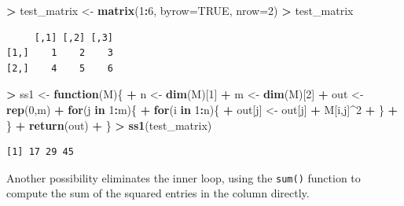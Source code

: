 \documentclass[]{krantz}
\makeatletter
\newenvironment{Shaded}{\begin{snugshade}}{\end{snugshade}}
\newcommand{\KeywordTok}[1]{\textcolor[rgb]{0.27,0.27,0.27}{\textbf{#1}}}
\newcommand{\DataTypeTok}[1]{\textcolor[rgb]{0.27,0.27,0.27}{#1}}
\newcommand{\DecValTok}[1]{\textcolor[rgb]{0.06,0.06,0.06}{#1}}
\newcommand{\StringTok}[1]{\textcolor[rgb]{0.5,0.5,0.5}{#1}}
\newcommand{\OtherTok}[1]{\textcolor[rgb]{0.37,0.37,0.37}{#1}}
\newcommand{\ControlFlowTok}[1]{\textcolor[rgb]{0.27,0.27,0.27}{\textbf{#1}}}
\newcommand{\OperatorTok}[1]{\textcolor[rgb]{0.43,0.43,0.43}{\textbf{#1}}}
\newcommand{\NormalTok}[1]{#1}
\newenvironment{kframe}{%
\medskip{}
\setlength{\fboxsep}{.8em}
 \def\at@end@of@kframe{}%
 \ifinner\ifhmode%
  \def\at@end@of@kframe{\end{minipage}}%
  \begin{minipage}{\columnwidth}%
 \fi\fi%
 \def\FrameCommand##1{\hskip\@totalleftmargin \hskip-\fboxsep
 \colorbox{shadecolor}{##1}\hskip-\fboxsep
     \hskip-\linewidth \hskip-\@totalleftmargin \hskip\columnwidth}%
 \MakeFramed {\advance\hsize-\width
   \@totalleftmargin\z@ \linewidth\hsize
   \@setminipage}}%
 {\par\unskip\endMakeFramed%
 \at@end@of@kframe}
\renewenvironment{Shaded}{\begin{kframe}}{\end{kframe}}
\makeatother
\begin{document}
\begin{Shaded}
\begin{Highlighting}[]
\OperatorTok{>}\StringTok{ }\NormalTok{test_matrix <-}\StringTok{ }\KeywordTok{matrix}\NormalTok{(}\DecValTok{1}\OperatorTok{:}\DecValTok{6}\NormalTok{, }\DataTypeTok{byrow=}\OtherTok{TRUE}\NormalTok{, }\DataTypeTok{nrow=}\DecValTok{2}\NormalTok{)}
\OperatorTok{>}\StringTok{ }\NormalTok{test_matrix}
\end{Highlighting}
\end{Shaded}

\begin{verbatim}
     [,1] [,2] [,3]
[1,]    1    2    3
[2,]    4    5    6
\end{verbatim}

\begin{Shaded}
\begin{Highlighting}[]
\OperatorTok{>}\StringTok{ }\NormalTok{ss1 <-}\StringTok{ }\ControlFlowTok{function}\NormalTok{(M)\{}
\OperatorTok{+}\StringTok{     }\NormalTok{n <-}\StringTok{ }\KeywordTok{dim}\NormalTok{(M)[}\DecValTok{1}\NormalTok{]}
\OperatorTok{+}\StringTok{     }\NormalTok{m <-}\StringTok{ }\KeywordTok{dim}\NormalTok{(M)[}\DecValTok{2}\NormalTok{]}
\OperatorTok{+}\StringTok{     }\NormalTok{out <-}\StringTok{ }\KeywordTok{rep}\NormalTok{(}\DecValTok{0}\NormalTok{,m)}
\OperatorTok{+}\StringTok{     }\ControlFlowTok{for}\NormalTok{(j }\ControlFlowTok{in} \DecValTok{1}\OperatorTok{:}\NormalTok{m)\{}
\OperatorTok{+}\StringTok{         }\ControlFlowTok{for}\NormalTok{(i }\ControlFlowTok{in} \DecValTok{1}\OperatorTok{:}\NormalTok{n)\{}
\OperatorTok{+}\StringTok{             }\NormalTok{out[j] <-}\StringTok{ }\NormalTok{out[j] }\OperatorTok{+}\StringTok{ }\NormalTok{M[i,j]}\OperatorTok{^}\DecValTok{2}
\OperatorTok{+}\StringTok{         }\NormalTok{\} }
\OperatorTok{+}\StringTok{     }\NormalTok{\}}
\OperatorTok{+}\StringTok{     }\KeywordTok{return}\NormalTok{(out)}
\OperatorTok{+}\StringTok{ }\NormalTok{\}}
\OperatorTok{>}\StringTok{ }\KeywordTok{ss1}\NormalTok{(test_matrix)}
\end{Highlighting}
\end{Shaded}

\begin{verbatim}
[1] 17 29 45
\end{verbatim}

Another possibility eliminates the inner loop, using the \texttt{sum()}
function to compute the sum of the squared entries in the column
directly.
\end{document}
